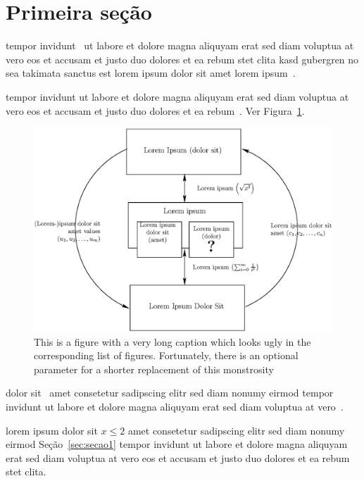 \documentclass[sigconf]{acmart}
\begin{document}
\section{Primeira seção}
tempor invidunt~\cite{SKIENAC698} ut labore et dolore magna
aliquyam erat sed diam voluptua at vero eos et accusam et justo
duo dolores et ea rebum stet clita kasd gubergren no sea takimata
sanctus est lorem ipsum dolor sit amet lorem
ipsum~\cite{NAGAPACKING07}.

tempor invidunt ut labore et dolore magna aliquyam erat sed diam
voluptua at vero eos et accusam et justo duo dolores et ea
rebum~\cite{CORMEMALGORITHMS01}. Ver Figura~\ref{fig:fig1}.

\begin{figure}[ht]
  \centering
  \includegraphics[width=\linewidth]{fig/exemplo}
\caption%
        {\label{fig:fig1}This is a figure with a very long
    caption which looks ugly in the corresponding list of figures.
    Fortunately, there is an optional parameter for a shorter
    replacement of this monstrosity}%
\end{figure}

dolor sit~\cite{BENTLEYBC07} amet consetetur sadipscing elitr sed
diam nonumy eirmod tempor invidunt ut labore et dolore magna
aliquyam erat sed diam voluptua at vero~\cite{BRIANPL04}.

lorem ipsum dolor sit $x\leq 2$  amet consetetur sadipscing elitr
sed diam nonumy eirmod Seção~\ref{sec:secao1} tempor invidunt ut
labore et dolore magna aliquyam erat sed diam voluptua at vero eos
et accusam et justo duo dolores et ea rebum stet
clita.~\cite{OLIVEIRAAPL08}
\end{document}
